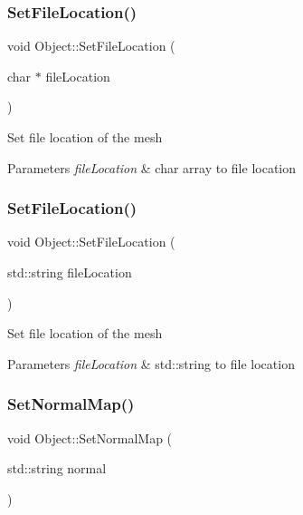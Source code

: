 \subsubsection{\texorpdfstring{SetFileLocation()}{SetFileLocation()}\hspace{0.1cm}{\footnotesize\ttfamily [1/2]}}
{\footnotesize\ttfamily void Object\+::\+Set\+File\+Location (\begin{DoxyParamCaption}\item[{char $\ast$}]{file\+Location }\end{DoxyParamCaption})}

Set file location of the mesh 
\begin{DoxyParams}{Parameters}
{\em file\+Location} & char array to file location \\
\hline
\end{DoxyParams}
\mbox{\label{class_object_a1ff1d0e120028e753efc51683379cc3b}} 
\subsubsection{\texorpdfstring{SetFileLocation()}{SetFileLocation()}\hspace{0.1cm}{\footnotesize\ttfamily [2/2]}}
{\footnotesize\ttfamily void Object\+::\+Set\+File\+Location (\begin{DoxyParamCaption}\item[{std\+::string}]{file\+Location }\end{DoxyParamCaption})}

Set file location of the mesh 
\begin{DoxyParams}{Parameters}
{\em file\+Location} & std\+::string to file location \\
\hline
\end{DoxyParams}
\mbox{\label{class_object_a0af7bfdeea968eb101c8c4558bd2e349}} 
\subsubsection{\texorpdfstring{SetNormalMap()}{SetNormalMap()}}
{\footnotesize\ttfamily void Object\+::\+Set\+Normal\+Map (\begin{DoxyParamCaption}\item[{std\+::string}]{normal }\end{DoxyParamCaption})}

